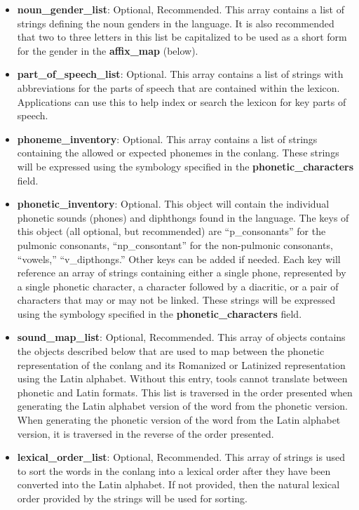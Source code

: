 \begin{itemize}
	\item \textbf{noun\_gender\_list}: Optional, Recommended. This array contains a list of strings defining the noun genders in the language.  It is also recommended that two to three letters in this list be capitalized to be used as a short form for the gender in the \textbf{affix\_map} (below).
	\item \textbf{part\_of\_speech\_list}: Optional.  This array contains a list of strings with abbreviations for the parts of speech that are contained within the lexicon.  Applications can use this to help index or search the lexicon for key parts of speech.
	\item \textbf{phoneme\_inventory}: Optional. This array contains a list of strings containing the allowed or expected phonemes in the conlang.  These strings will be expressed using the symbology specified in the \textbf{phonetic\_characters} field.
	\item \textbf{phonetic\_inventory}: Optional. This object will contain the individual phonetic sounds (phones) and diphthongs found in the language.  The keys of this object (all optional, but recommended) are ``p\_consonants'' for the pulmonic consonants, ``np\_consontant'' for the non-pulmonic consonants, ``vowels,'' ``v\_dipthongs.''  Other keys can be added if needed.  Each key will reference an array of strings containing either a single phone, represented by a single phonetic character, a character followed by a diacritic, or a pair of characters that may or may not be linked.  These strings will be expressed using the symbology specified in the \textbf{phonetic\_characters} field.
	\item \textbf{sound\_map\_list}: Optional, Recommended. This array of objects contains the objects described below that are used to map between the phonetic representation of the conlang and its Romanized or Latinized representation using the Latin alphabet.  Without this entry, tools cannot translate between phonetic and Latin formats.  This list is traversed in the order presented when generating the Latin alphabet version of the word from the phonetic version.  When generating the phonetic version of the word from the Latin alphabet version, it is traversed in the reverse of the order presented.
	\item \textbf{lexical\_order\_list}: Optional, Recommended. This array of strings is used to sort the words in the conlang into a lexical order after they have been converted into the Latin alphabet.  If not provided, then the natural lexical order provided by the strings will be used for sorting.

\end{itemize}
